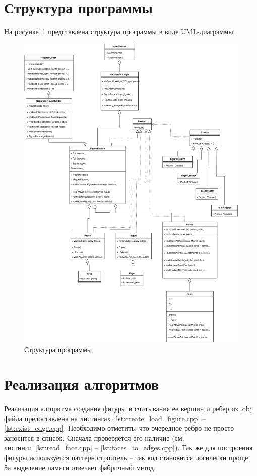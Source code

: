 \section{Структура программы}
На рисунке~\ref{fig:uml_programm} представлена структура программы в виде UML-диаграммы.

\begin{figure}[H]
	\centering
	\includegraphics[scale=0.54]{images/programm.pdf}
	\caption{Структура программы}
	\label{fig:uml_programm}
\end{figure}

\newpage

\section{Реализация алгоритмов}
Реализация алгоритма создания фигуры и считывания ее вершин и ребер из .obj файла предоставлена на листингах~\ref{lst:create_load_figure.cpp} -- \ref{lst:exist_edge.cpp}.
Необходимо отметить, что очередное ребро не просто заносится в список. 
Сначала проверяется его наличие (см. листинги~\ref{lst:read_face.cpp} -- \ref{lst:faces_to_edges.cpp}).
Так же для построения фигуры используется паттерн строитель – так код становится логически проще.
За выделение памяти отвечает фабричный метод.

